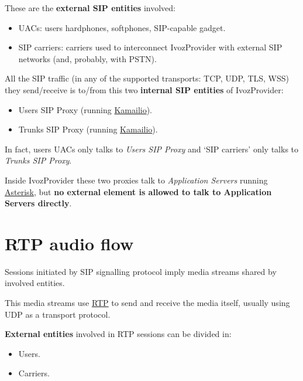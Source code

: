 \documentclass[letterpaper,10pt,english]{sphinxmanual}
\begin{document}
These are the \textbf{external SIP entities} involved:
\begin{itemize}
\item {} 
UACs: users hardphones, softphones, SIP-capable gadget.

\item {} 
SIP carriers: carriers used to interconnect IvozProvider with external SIP
networks (and, probably, with PSTN).

\end{itemize}

All the SIP traffic (in any of the supported transports: TCP, UDP, TLS, WSS)
they send/receive is to/from this two \textbf{internal SIP entities} of IvozProvider:
\begin{itemize}
\item {} 
Users SIP Proxy (running \href{https://www.kamailio.org}{Kamailio}).

\item {} 
Trunks SIP Proxy (running \href{https://www.kamailio.org}{Kamailio}).

\end{itemize}

In fact, users UACs only talks to \emph{Users SIP Proxy} and `SIP carriers' only talks
to \emph{Trunks SIP Proxy}.

Inside IvozProvider these two proxies talk to \emph{Application Servers} running
\href{http://www.asterisk.org/}{Asterisk}, but \textbf{no external element is allowed
to talk to Application Servers directly}.


\section{RTP audio flow}
\label{basics/architecture/index:rtp-audio-flow}\label{basics/architecture/index:audioflow}
Sessions initiated by SIP signalling protocol imply media streams shared by
involved entities.

This media streams use \href{https://tools.ietf.org/html/rfc3550}{RTP} to send and
receive the media itself, usually using UDP as a transport protocol.

\textbf{External entities} involved in RTP sessions can be divided in:
\begin{itemize}
\item {} 
Users.

\item {} 
Carriers.

\end{itemize}
\end{document}
